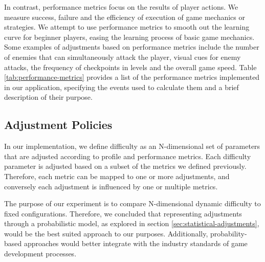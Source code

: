 


In contrast, performance metrics focus on the results of player actions. We measure success, failure and the efficiency of execution of game mechanics or strategies. We attempt to use performance metrics to smooth out the learning curve for beginner players, easing the learning process of basic game mechanics. Some examples of adjustments based on performance metrics include the number of enemies that can simultaneously attack the player, visual cues for enemy attacks, the frequency of checkpoints in levels and the overall game speed. Table \ref{tab:performance-metrics} provides a list of the performance metrics implemented in our application, specifying the events used to calculate them and a brief description of their purpose.




\subsection{Adjustment Policies}
\label{sec:adjustments}

In our implementation, we define difficulty as an N-dimensional set of parameters that are adjusted according to profile and performance metrics. Each difficulty parameter is adjusted based on a subset of the metrics we defined previously. Therefore, each metric can be mapped to one or more adjustments, and conversely each adjustment is influenced by one or multiple metrics.

The purpose of our experiment is to compare N-dimensional dynamic difficulty to fixed configurations. Therefore, we concluded that representing adjustments through a probabilistic model, as explored in section \ref{sec:statistical-adjustments}, would be the best suited approach to our purposes. Additionally, probability-based approaches would better integrate with the industry standards of game development processes.

